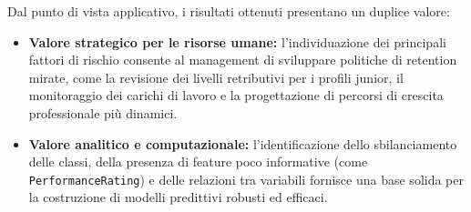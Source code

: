 \documentclass[11pt,a4paper]{article}
\begin{document}
Dal punto di vista applicativo, i risultati ottenuti presentano un duplice valore:
\begin{itemize}
    \item \textbf{Valore strategico per le risorse umane:} l’individuazione dei principali fattori di rischio consente al management di sviluppare politiche di retention mirate, come la revisione dei livelli retributivi per i profili junior, il monitoraggio dei carichi di lavoro e la progettazione di percorsi di crescita professionale più dinamici.
    
    \item \textbf{Valore analitico e computazionale:} l’identificazione dello sbilanciamento delle classi, della presenza di feature poco informative (come \texttt{PerformanceRating}) e delle relazioni tra variabili fornisce una base solida per la costruzione di modelli predittivi robusti ed efficaci.
\end{itemize}


 
 
\end{document}
